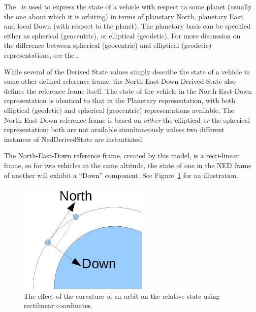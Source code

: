%
%
% 
%



The \NEDDesc\ is used to express the state of a vehicle with respect to some planet (usually the one about which it is orbiting) in terms of planetary North, planetary East, and local Down (with respect to the planet).  The planetary basis can be specified either as spherical (geocentric), or elliptical (geodetic).  For more discussion on the difference between spherical (geocentric) and elliptical (geodetic) representations, see the .

While several of the Derived State values simply describe the state of a vehicle in some other defined reference frame, the North-East-Down Derived State also defines the reference frame itself.  The state of the vehicle in the North-East-Down representation is identical to that in the Planetary representation, with both elliptical (geodetic) and spherical (geocentric) representations available.  The North-East-Down reference frame is based on \textit{either} the elliptical \textit{or} the spherical representation; both are not available simultaneously unless two different instances of NedDerivedState are instantiated.

The North-East-Down reference frame, created by this model, is a recti-linear frame, so for two vehicles at the same altitude, the state of one in the NED frame of another will exhibit a ``Down'' component. See Figure~\ref{fig:nedrectilinear} for an illustration.

\begin{figure}[!ht]
\begin{center}
\includegraphics[width=2.5in]{figures/rectilinear.jpg}
\caption{The effect of the curvature of an orbit on the relative state using rectilinear coordinates.}
\label{fig:nedrectilinear}
\end{center}
\end{figure}













